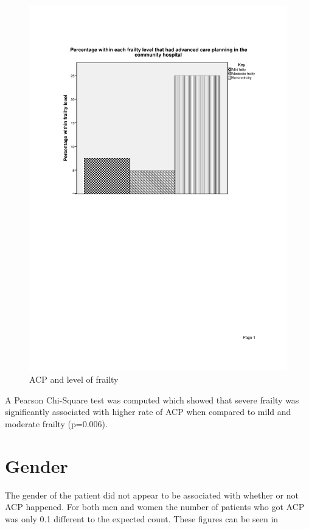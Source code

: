 \documentclass
[
	12pt,
	a4paper,
	oneside,
]{report}
\begin{document}
\begin{figure}[ht]
\caption{ACP and level of frailty}
\label{fig:chart-frailty-level-acp}
\includegraphics[width=\textwidth,
	trim={2.5cm 14cm 2.5cm 2.5cm},
	clip]{media/graph-frailty-level-acp}
\end{figure}

A Pearson Chi-Square test was computed which showed that severe frailty was
significantly associated with higher rate of ACP when compared to mild and
moderate frailty (p=0.006).

\section{Gender}

The gender of the patient did not appear to be associated with whether or not 
ACP happened. For both men and women the number of patients who got ACP was
only 0.1 different to the expected count. These figures can be seen in 
\end{document}
